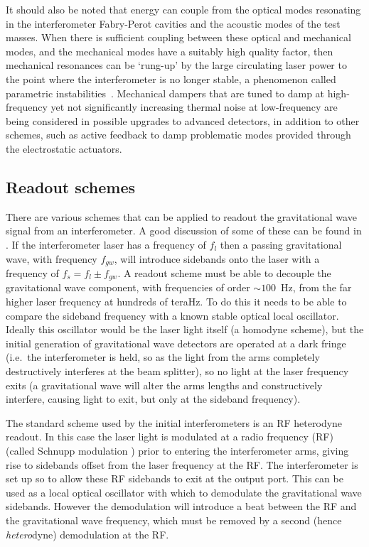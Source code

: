 \documentclass{article}
\begin{document}
It should also be noted that energy can couple from the optical modes resonating
in the interferometer Fabry-Perot cavities and the acoustic modes of the test
masses. When there is sufficient coupling between these optical and mechanical
modes, and the mechanical modes have a suitably high quality factor, then
mechanical resonances can be `rung-up' by the large circulating laser power to
the point where the interferometer is no longer stable, a phenomenon called
parametric instabilities~\cite{Braginsky:2001}. Mechanical dampers that are
tuned to damp at high-frequency yet not significantly increasing thermal noise
at low-frequency are being considered in possible upgrades to advanced
detectors, in addition to other schemes, such as active feedback to damp
problematic modes provided through the electrostatic actuators.


\subsection{Readout schemes}\label{sec:readout}
There are various schemes that can be applied to readout the gravitational wave
signal from an interferometer. A good discussion of some of these can be found
in \cite{Hild:2009}. If the interferometer laser has a frequency of $f_l$ then a
passing gravitational wave, with frequency $f_{gw}$, will introduce sidebands
onto the laser with a frequency of $f_s = f_l \pm f_{gw}$. A readout scheme must
be able to decouple the gravitational wave component, with frequencies of order
$\sim100$~Hz, from the far higher laser frequency at hundreds of teraHz. To do
this it needs to be able to compare the sideband frequency with a known stable
optical local oscillator. Ideally this oscillator would be the laser light
itself (a homodyne scheme), but the initial generation of gravitational wave
detectors are operated at a dark fringe (i.e.~the interferometer is held, so as
the light from the arms completely destructively interferes at the beam
splitter), so no light at the laser frequency exits (a gravitational wave will
alter the arms lengths and constructively interfere, causing light to exit, but 
only at the sideband frequency).

The standard scheme used by the initial interferometers is an RF heterodyne
readout. In this case the laser light is modulated at a radio frequency (RF)
(called Schnupp modulation \cite{Schnupp:1988}) prior to entering the
interferometer arms, giving rise to sidebands offset from the laser frequency at
the RF. The interferometer is set up so to allow these RF sidebands to exit at
the output port. This can be used as a local optical oscillator with which to
demodulate the gravitational wave sidebands. However the demodulation will
introduce a beat between the RF and the gravitational wave frequency, which must
be removed by a second (hence {\it hetero}dyne) demodulation at the RF.
\end{document}
